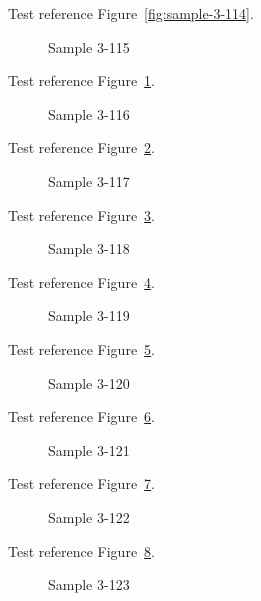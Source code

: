 Test reference Figure~\ref{fig:sample-3-114}.

\begin{figure}[tbhp]
\caption{Sample 3-115}
\label{fig:sample-3-115}
\end{figure}

Test reference Figure~\ref{fig:sample-3-115}.

\begin{figure}[tbhp]
\caption{Sample 3-116}
\label{fig:sample-3-116}
\end{figure}

Test reference Figure~\ref{fig:sample-3-116}.

\begin{figure}[tbhp]
\caption{Sample 3-117}
\label{fig:sample-3-117}
\end{figure}

Test reference Figure~\ref{fig:sample-3-117}.

\begin{figure}[tbhp]
\caption{Sample 3-118}
\label{fig:sample-3-118}
\end{figure}

Test reference Figure~\ref{fig:sample-3-118}.

\begin{figure}[tbhp]
\caption{Sample 3-119}
\label{fig:sample-3-119}
\end{figure}

Test reference Figure~\ref{fig:sample-3-119}.

\begin{figure}[tbhp]
\caption{Sample 3-120}
\label{fig:sample-3-120}
\end{figure}

Test reference Figure~\ref{fig:sample-3-120}.

\begin{figure}[tbhp]
\caption{Sample 3-121}
\label{fig:sample-3-121}
\end{figure}

Test reference Figure~\ref{fig:sample-3-121}.

\begin{figure}[tbhp]
\caption{Sample 3-122}
\label{fig:sample-3-122}
\end{figure}

Test reference Figure~\ref{fig:sample-3-122}.

\begin{figure}[tbhp]
\caption{Sample 3-123}
\label{fig:sample-3-123}
\end{figure}

